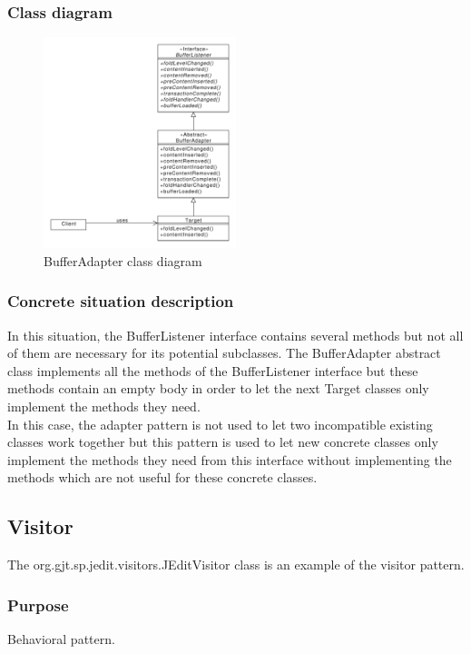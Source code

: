 \documentclass[a4paper,10pt]{article}
\begin{document}
\subsubsection{Class diagram}
\begin{center}
\begin{figure}[h]
  \centerline{\includegraphics[width=0.5\textwidth]{adapter-bufferadapter-class-diagram.pdf}}
  \caption{BufferAdapter class diagram}
\end{figure}
\end{center}
\subsubsection{Concrete situation description}
In this situation, the BufferListener interface contains several methods but not all of them are necessary for its potential subclasses. The BufferAdapter abstract class implements all the methods of the BufferListener interface but these methods contain an empty body in order to let the next Target classes only implement the methods they need.\\
In this case, the adapter pattern is not used to let two incompatible existing classes work together but this pattern is used to let new concrete classes only implement the methods they need from this interface without implementing the methods which are not useful for these concrete classes.

\newpage
\subsection{Visitor}
The org.gjt.sp.jedit.visitors.JEditVisitor class is an example of the visitor pattern.
\subsubsection{Purpose}
Behavioral pattern.
\end{document}
